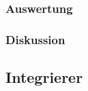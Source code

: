 \documentclass[12pt,a4paper]{article}
\begin{document}
\subsubsection{Auswertung}
\subsubsection{Diskussion}


\subsection{Integrierer}
\end{document}

